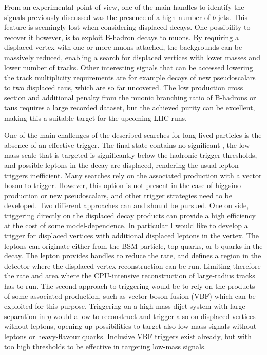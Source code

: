 \hspace{20pt}From an experimental point of view, one of the main handles to identify the signals previously discussed was the presence of a high number of $b$-jets. This feature is seemingly lost when considering displaced decays. One possibility to recover it however, is to exploit B-hadron decays to muons. By requiring a displaced vertex with one or more muons attached, the backgrounds can be massively reduced, enabling a search for displaced vertices with lower masses and lower number of tracks. Other interesting signals that can be accessed lowering the track multiplicity requirements are for example decays of new pseudoscalars to two displaced taus, which are so far uncovered. The low production cross section and additional penalty from the muonic branching ratio of B-hadrons or taus requires a large recorded dataset, but the achieved purity can be excellent, making this a suitable target for the upcoming LHC runs. 

\hspace{20pt}One of the main challenges of the described searches for long-lived particles is the absence of an effective trigger. The final state contains no significant \met, the low mass scale that is targeted is significantly below the hadronic trigger thresholds, and possible leptons in the decay are displaced, rendering the usual lepton triggers inefficient. Many searches rely on the associated production with a vector boson to trigger. However, this option is not present in the case of higgsino production or new pseudoscalars, and other trigger strategies need to be developed.
Two different approaches can and should be pursued. One on side, triggering directly on the displaced decay products can provide a high efficiency at the cost of some model-dependence. In particular I would like to develop a trigger for displaced vertices with additional displaced leptons in the vertex. The leptons can originate either from the BSM particle, top quarks, or b-quarks in the decay. The lepton provides handles to reduce the rate, and defines a region in the detector where the displaced vertex reconstruction can be run. Limiting therefore the rate and area where the CPU-intensive reconstruction of large-radius tracks has to run.
The second approach to triggering would be to rely on the products of some associated production, such as vector-boson-fusion (VBF) which can be exploited for this purpose. Triggering on a high-mass dijet system with large separation in $\eta$ would allow to reconstruct and trigger also on displaced vertices without leptons, opening up possibilities to target also low-mass signals without leptons or heavy-flavour quarks. Inclusive VBF triggers exist already, but with too high thresholds to be effective in targeting low-mass signals.

